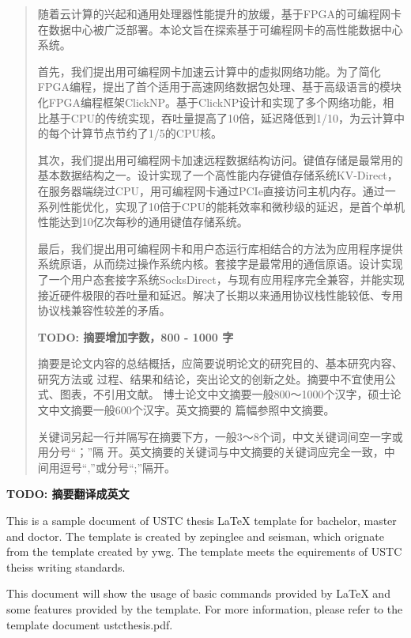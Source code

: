 
\begin{abstract}
随着云计算的兴起和通用处理器性能提升的放缓，基于FPGA的可编程网卡在数据中心被广泛部署。本论文旨在探索基于可编程网卡的高性能数据中心系统。

首先，我们提出用可编程网卡加速云计算中的虚拟网络功能。为了简化FPGA编程，提出了首个适用于高速网络数据包处理、基于高级语言的模块化FPGA编程框架ClickNP。基于ClickNP设计和实现了多个网络功能，相比基于CPU的传统实现，吞吐量提高了10倍，延迟降低到1/10，为云计算中的每个计算节点节约了1/5的CPU核。

其次，我们提出用可编程网卡加速远程数据结构访问。键值存储是最常用的基本数据结构之一。设计实现了一个高性能内存键值存储系统KV-Direct，在服务器端绕过CPU，用可编程网卡通过PCIe直接访问主机内存。通过一系列性能优化，实现了10倍于CPU的能耗效率和微秒级的延迟，是首个单机性能达到10亿次每秒的通用键值存储系统。

最后，我们提出用可编程网卡和用户态运行库相结合的方法为应用程序提供系统原语，从而绕过操作系统内核。套接字是最常用的通信原语。设计实现了一个用户态套接字系统SocksDirect，与现有应用程序完全兼容，并能实现接近硬件极限的吞吐量和延迟。解决了长期以来通用协议栈性能较低、专用协议栈兼容性较差的矛盾。

\textbf{TODO: 摘要增加字数，800 - 1000 字}

  摘要是论文内容的总结概括，应简要说明论文的研究目的、基本研究内容、 研究方法或
  过程、结果和结论，突出论文的创新之处。摘要中不宜使用公式、图表，不引用文献。
  博士论文中文摘要一般800～1000个汉字，硕士论文中文摘要一般600个汉字。英文摘要的
  篇幅参照中文摘要。

  关键词另起一行并隔写在摘要下方，一般3～8个词，中文关键词间空一字或用分号“；”隔
  开。英文摘要的关键词与中文摘要的关键词应完全一致，中间用逗号“,”或分号“;”隔开。

\end{abstract}

\begin{enabstract}
	
\textbf{TODO: 摘要翻译成英文}

  This is a sample document of USTC thesis \LaTeX{} template for bachelor,
  master and doctor. The template is created by zepinglee and seisman, which
  orignate from the template created by ywg. The template meets the
  equirements of USTC theiss writing standards.

  This document will show the usage of basic commands provided by \LaTeX{} and
  some features provided by the template. For more information, please refer to
  the template document ustcthesis.pdf.

\end{enabstract}
